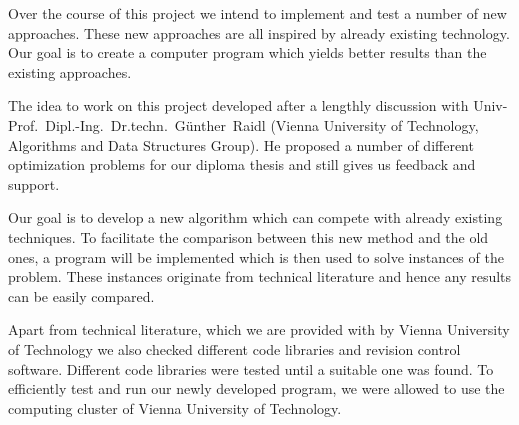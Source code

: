 \documentclass[paper = a4, fontsize = 10pt]{scrartcl}
\begin{document}
Over the course of this project we intend to implement and test a number of new approaches. These new approaches are all inspired by already existing technology. Our goal is to create a computer program which
yields better results than the existing approaches.


The idea to work on this project developed after a lengthly discussion with Univ-Prof.~Dipl.-Ing.~Dr.techn.~Günther~Raidl (Vienna University of Technology, Algorithms and Data Structures Group). He proposed a number of different optimization problems for our diploma thesis and still gives us feedback and support.


Our goal is to develop a new algorithm which can compete with already existing techniques. To facilitate the comparison between this new method and the old ones, a program will be implemented which is then used to solve instances of the problem. These instances originate from technical literature and hence any results can be easily compared.


Apart from technical literature, which we are provided with by Vienna University of Technology we also checked different code libraries and revision control software. Different code libraries were tested until a suitable one was found. To efficiently test and run our newly developed program, we were allowed to use the computing cluster of Vienna University of Technology.

\end{document}
